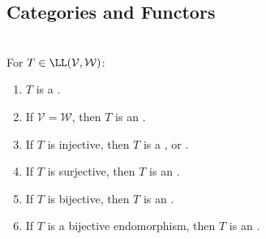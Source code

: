 \subsection{Categories and Functors}

\begin{definition} \label{def:linear-map-morphism-terminology} \\
For $T\in\LL(\mathcal{V},\mathcal{W})$:
\begin{enumerate}[label=(\roman*)]
\setlength{\itemsep}{0pt}
\item $T$ is a .
\item If $\mathcal{V}=\mathcal{W}$, then $T$ is an .
\item If $T$ is injective, then $T$ is a , or .
\item If $T$ is surjective, then $T$ is an .
\item If $T$ is bijective, then $T$ is an .
\item If $T$ is a bijective endomorphism, then $T$ is an .
\end{enumerate}
\end{definition}

